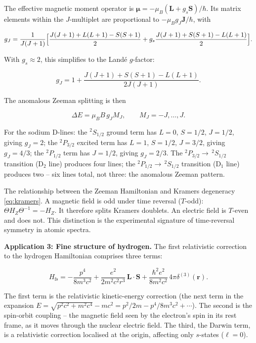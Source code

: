 The effective magnetic moment operator is $\bm\mu = -\mu_{B}(\bm L + g_{s}\bm S)/\hbar$. Its matrix elements within the $J$-multiplet are proportional to $-\mu_{B}g_{J}\bm J/\hbar$, with
\begin{linenomath}
\begin{equation*}
g_{J} = \frac{1}{J(J+1)}\Bigl[
\frac{J(J+1)+L(L+1)-S(S+1)}{2}
+ g_{s}\frac{J(J+1)+S(S+1)-L(L+1)}{2}
\Bigr].
\end{equation*}
\end{linenomath}
With $g_{s} \approx 2$, this simplifies to the Land\'e $g$-factor:
\begin{linenomath}
\begin{equation}
g_{J} = 1 + \frac{J(J+1) + S(S+1) - L(L+1)}{2J(J+1)}.
\label{eq:lande-g-factor}
\end{equation}
\end{linenomath}
The anomalous Zeeman splitting is then
\begin{linenomath}
\begin{equation*}
\Delta E = \mu_{B}B\,g_{J}M_{J},
\qquad M_{J} = -J,\ldots,J.
\end{equation*}
\end{linenomath}
For the sodium D-lines: the $^{2}S_{1/2}$ ground term has $L=0$, $S=1/2$, $J=1/2$, giving $g_{J}=2$; the $^{2}P_{3/2}$ excited term has $L=1$, $S=1/2$, $J=3/2$, giving $g_{J}=4/3$; the $^{2}P_{1/2}$ term has $J=1/2$, giving $g_{J}=2/3$. The $^{2}P_{3/2} \to\, ^{2}S_{1/2}$ transition (D$_{2}$ line) produces four lines; the $^{2}P_{1/2} \to\, ^{2}S_{1/2}$ transition (D$_{1}$ line) produces two -- six lines total, not three: the anomalous Zeeman pattern.

\begin{note}
The relationship between the Zeeman Hamiltonian and Kramers degeneracy \eqref{eq:kramers}. A magnetic field is odd under time reversal ($T$-odd): $\Theta H_{Z}\Theta^{-1} = -H_{Z}$. It therefore splits Kramers doublets. An electric field is $T$-even and does not. This distinction is the experimental signature of time-reversal symmetry in atomic spectra.
\end{note}

\medskip\noindent\textbf{Application 3: Fine structure of hydrogen.}
The first relativistic correction to the hydrogen Hamiltonian comprises three terms:
\begin{linenomath}
\begin{equation}
H_{\text{fs}} = -\frac{p^{4}}{8m^{3}c^{2}} + \frac{e^{2}}{2m^{2}c^{2}r^{3}}\,\bm L\!\cdot\!\bm S + \frac{\hbar^{2}e^{2}}{8m^{2}c^{2}}\,4\pi\delta^{(3)}(\bm r).
\label{eq:fine-structure-hamiltonian}
\end{equation}
\end{linenomath}
The first term is the relativistic kinetic-energy correction (the next term in the expansion $E = \sqrt{p^{2}c^{2}+m^{2}c^{4}} - mc^{2} = p^{2}/2m - p^{4}/8m^{3}c^{2} + \cdots$). The second is the spin-orbit coupling -- the magnetic field seen by the electron's spin in its rest frame, as it moves through the nuclear electric field. The third, the Darwin term, is a relativistic correction localised at the origin, affecting only $s$-states ($\ell=0$).

